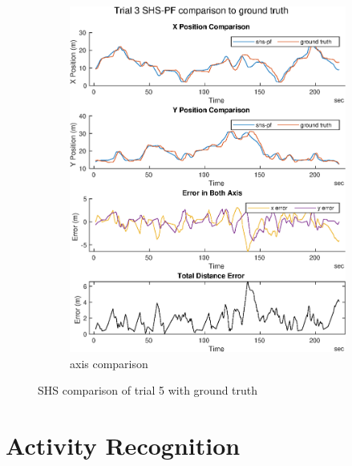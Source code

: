 \begin{figure}[H]
\begin{subfigure}[t]{.45\textwidth}
		\includegraphics[width=\linewidth]{images/20201029_1804_shs-pf_trial_3_1}
		\caption{axis comparison}
		\label{fig:shspf_trial3_comparison}
	\end{subfigure}
	\caption{SHS comparison of trial 5 with ground truth}
	\label{fig:shspf_trial3_shs_gt_comparison}
\end{figure}

\section{Activity Recognition}

